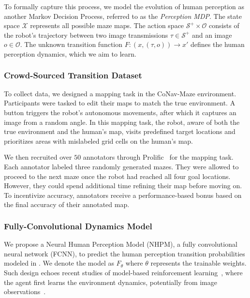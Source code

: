 To formally capture this process, we model the evolution of human perception as another Markov Decision Process, referred to as the \emph{Perception MDP}. The state space $\mathcal{X}$ represents all possible maze maps. The action space $\mathcal{S}^+ \times \mathcal{O}$ consists of the robot's trajectory between two image transmissions $\tau \in \mathcal{S}^+$ and an image $o \in \mathcal{O}$. The unknown transition function $F: (x, (\tau, o)) \rightarrow x'$ defines the human perception dynamics, which we aim to learn.

\subsubsection{Crowd-Sourced Transition Dataset}
To collect data, we designed a mapping task in the CoNav-Maze environment. Participants were tasked to edit their maps to match the true environment. A button triggers the robot's autonomous movements, after which it captures an image from a random angle.
In this mapping task, the robot, aware of both the true environment and the human’s map, visits predefined target locations and prioritizes areas with mislabeled grid cells on the human’s map.

We then recruited over $50$ annotators through Prolific~\cite{palan2018prolific} for the mapping task. Each annotator labeled three randomly generated mazes. They were allowed to proceed to the next maze once the robot had reached all four goal locations. However, they could spend additional time refining their map before moving on. To incentivize accuracy, annotators receive a performance-based bonus based on the final accuracy of their annotated map.


\subsubsection{Fully-Convolutional Dynamics Model}
\label{sec:nhpm}

We propose a Neural Human Perception Model (NHPM), a fully convolutional neural network (FCNN), to predict the human perception transition probabilities modeled in . We denote the model as $F_\theta$ where $\theta$ represents the trainable weights. Such design echoes recent studies of model-based reinforcement learning~\cite{hansen2022temporal}, where the agent first learns the environment dynamics, potentially from image observations~\cite{hafner2019learning,watter2015embed}.

